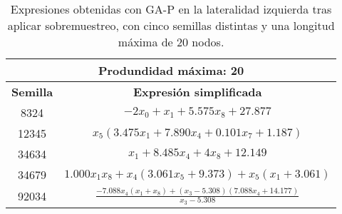 \begin{table}[H]
\centering
\begin{tabular}{|c|c|}
\hline
\multicolumn{2}{|c|}{\textbf{Produndidad máxima: 20}}                                                                                                             \\ \hline
\textbf{Semilla} & \textbf{Expresión simplificada}                                                                                                                \\ \hline
8324             & $- 2 x_{0} + x_{1} + 5.575 x_{8} + 27.877$                                                                                               \\ \hline
12345            & $x_{5} \left(3.475 x_{1} + 7.890 x_{4} + 0.101 x_{7} + 1.187\right)$                                                        \\ \hline
34634            & $x_{1} + 8.485 x_{4} + 4 x_{8} + 12.149$                                                                                             \\ \hline
34679            & $1.000 x_{1} x_{8} + x_{4} \left(3.061 x_{5} + 9.373\right) + x_{5} \left(x_{1} + 3.061\right)$                              \\ \hline
92034            & $\frac{- 7.088 x_{4} \left(x_{1} + x_{8}\right) + \left(x_{3} - 5.308\right) \left(7.088 x_{4} + 14.177\right)}{x_{3} - 5.308}$ \\ \hline
\end{tabular}%
\caption{Expresiones obtenidas con GA-P en la lateralidad izquierda tras aplicar sobremuestreo, con cinco semillas distintas y una longitud máxima de 20 nodos.}\label{table:exp_GAP_over_l0_20}
\end{table}





